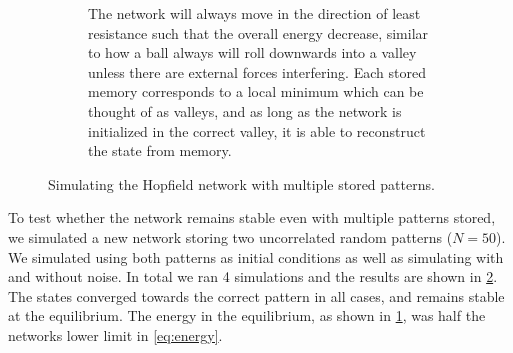 \begin{figure}[H]
\begin{subfigure}{0.49\textwidth}
        \caption{The network will always move in the direction of least resistance such that the overall energy decrease, similar to how a ball always will roll downwards into a valley unless there are external forces interfering. Each stored memory corresponds to a local minimum which can be thought of as valleys, and as long as the network is initialized in the correct valley, it is able to reconstruct the state from memory.}
        \label{fig:multiple-energy}
    \end{subfigure}
    \caption{Simulating the Hopfield network with multiple stored patterns.}
    \label{fig:multiple}
\end{figure}
To test whether the network remains stable even with multiple patterns stored, we simulated a new network storing two uncorrelated random patterns ($N=50$). We simulated using both patterns as initial conditions as well as simulating with and without noise. In total we ran 4 simulations and the results are shown in \cref{fig:multiple}. The states converged towards the correct pattern in all cases, and remains stable at the equilibrium. The energy in the equilibrium, as shown in \cref{fig:multiple-energy}, was half the networks lower limit in \cref{eq:energy}.
 

